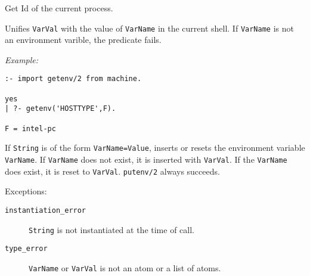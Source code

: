 \begin{description}
Get Id of the current process.

%
Unifies {\tt VarVal} with the value of {\tt VarName} in the current
shell.  If {\tt VarName} is not an environment varible, the predicate
fails.

{\em Example:}
\begin{verbatim}
:- import getenv/2 from machine.

yes
| ?- getenv('HOSTTYPE',F).

F = intel-pc
\end{verbatim}

%
If {\tt String} is of the form {\tt VarName=Value}, inserts or resets
the environment variable {\tt VarName}.  If {\tt VarName} does not
exist, it is inserted with {\tt VarVal}.  If the {\tt VarName} does
exist, it is reset to {\tt VarVal}.  {\tt putenv/2} always succeeds.

Exceptions:
    \begin{description}
    \item[{\tt instantiation\_error}] {\tt String} is
      not instantiated at the time of call.
    \item[{\tt type\_error}]
        {\tt VarName} or {\tt VarVal} is not an atom or a list of atoms.
    \end{description}

\end{description}

